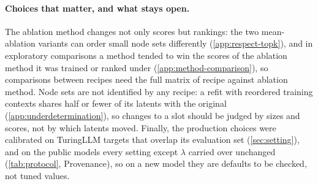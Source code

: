 \paragraph{Choices that matter, and what stays open.}
The ablation method changes not only scores but rankings: the two mean-ablation variants can order small node sets differently (\cref{app:respect-topk}), and in exploratory comparisons a method tended to win the scores of the ablation method it was trained or ranked under (\cref{app:method-comparison}), so comparisons between recipes need the full matrix of recipe against ablation method.
Node sets are not identified by any recipe: a refit with reordered training contexts shares half or fewer of its latents with the original (\cref{app:underdetermination}), so changes to a slot should be judged by sizes and scores, not by which latents moved.
Finally, the production choices were calibrated on TuringLLM targets that overlap its evaluation set (\cref{sec:setting}), and on the public models every setting except $\lambda$ carried over unchanged (\cref{tab:protocol}, Provenance), so on a new model they are defaults to be checked, not tuned values.

\else\ifx\frameworkpart\frameworkhistory
